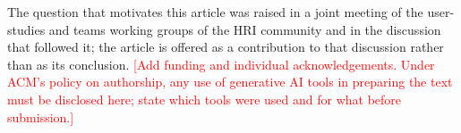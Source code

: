 \documentclass[manuscript,screen,review]{acmart}
\newcommand{\todo}[1]{\textcolor{red}{[#1]}}
\begin{document}
\FloatBarrier
\begin{acks}
The question that motivates this article was raised in a joint meeting of the
user-studies and teams working groups of the HRI community and in the
discussion that followed it; the article is offered as a contribution to that
discussion rather than as its conclusion.
\todo{Add funding and individual acknowledgements. Under ACM's policy on
authorship, any use of generative AI tools in preparing the text must be
disclosed here; state which tools were used and for what before submission.}
\end{acks}




\appendix

\end{document}
